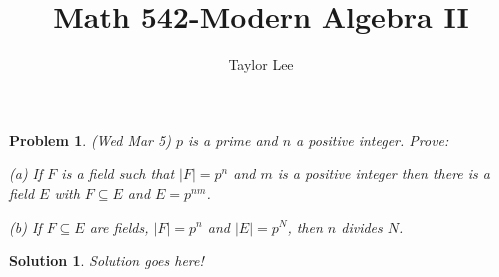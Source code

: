 \documentclass[12pt]{article}
\theoremstyle{moo}
\newtheorem*{prob}{Problem}
\newtheorem*{sol}{Solution}
\def\su{\subseteq}
\begin{document}
\fontseries {\seriesdefault}
\fontshape {\shapedefault}
\selectfont

\title{ Math 542-Modern Algebra II}
\date{\usdate {}}         
\author{Taylor Lee}                          
\maketitle                      



\begin{prob}
(Wed Mar 5) $p$ is a prime and $n$ a positive integer.
Prove:
\par (a) If $F$ is a field such that $|F|=p^n$ and $m$ is a
positive integer then there is a field $E$ with $F\su E$
and $E=p^{nm}$.
\par (b) If $F\su E$ are fields, $|F|=p^n$
and $|E|=p^N$, then $n$ divides $N$.
\end{prob}




\begin{sol}

Solution goes here!

\end{sol}
\end{document}
